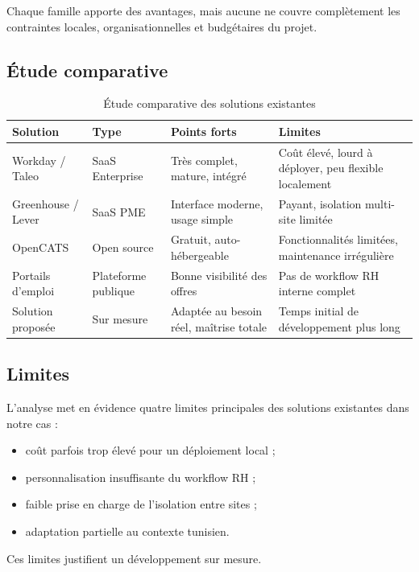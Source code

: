 Chaque famille apporte des avantages, mais aucune ne couvre complètement
les contraintes locales, organisationnelles et budgétaires du projet.

\subsection{Étude comparative}

\begin{table}[H]
\centering
\caption{Étude comparative des solutions existantes}
\begin{tabularx}{\textwidth}{|l|l|X|X|}
\hline
\textbf{Solution} & \textbf{Type} & \textbf{Points forts} & \textbf{Limites} \\
\hline
Workday / Taleo & SaaS Enterprise & Très complet, mature, intégré &
Coût élevé, lourd à déployer, peu flexible localement \\
\hline
Greenhouse / Lever & SaaS PME & Interface moderne, usage simple &
Payant, isolation multi-site limitée \\
\hline
OpenCATS & Open source & Gratuit, auto-hébergeable &
Fonctionnalités limitées, maintenance irrégulière \\
\hline
Portails d'emploi & Plateforme publique & Bonne visibilité des offres &
Pas de workflow RH interne complet \\
\hline
Solution proposée & Sur mesure & Adaptée au besoin réel, maîtrise totale &
Temps initial de développement plus long \\
\hline
\end{tabularx}
\end{table}

\subsection{Limites}

L'analyse met en évidence quatre limites principales des solutions
existantes dans notre cas :
\begin{itemize}
    \item coût parfois trop élevé pour un déploiement local ;
    \item personnalisation insuffisante du workflow RH ;
    \item faible prise en charge de l'isolation entre sites ;
    \item adaptation partielle au contexte tunisien.
\end{itemize}

Ces limites justifient un développement sur mesure.


